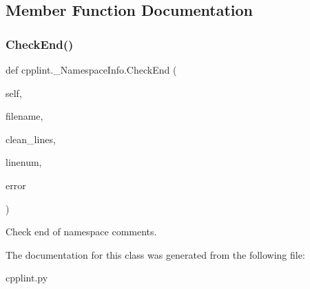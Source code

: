 \subsection{Member Function Documentation}
\mbox{\label{classcpplint_1_1__NamespaceInfo_a9d3abaeed0353942ca689eeeb2f2924b}} 
\subsubsection{\texorpdfstring{Check\+End()}{CheckEnd()}}
{\footnotesize\ttfamily def cpplint.\+\_\+\+Namespace\+Info.\+Check\+End (\begin{DoxyParamCaption}\item[{}]{self,  }\item[{}]{filename,  }\item[{}]{clean\+\_\+lines,  }\item[{}]{linenum,  }\item[{}]{error }\end{DoxyParamCaption})}

\begin{DoxyVerb}Check end of namespace comments.\end{DoxyVerb}
 

The documentation for this class was generated from the following file\+:\begin{DoxyCompactItemize}
\item 
cpplint.\+py\end{DoxyCompactItemize}

